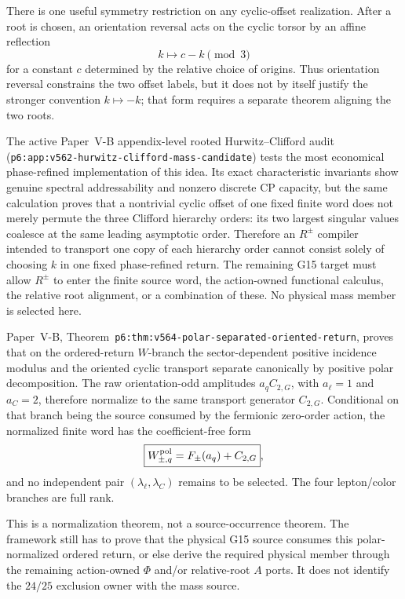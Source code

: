 \documentclass[11pt,a4paper]{article}
\begin{document}
There is one useful symmetry restriction on any cyclic-offset realization.
After a root is chosen, an orientation reversal acts on the cyclic torsor by
an affine reflection
\begin{equation}
\label{p5:eq:v369-affine-cyclic-reflection}
 k\longmapsto c-k\pmod 3
\end{equation}
for a constant \(c\) determined by the relative choice of origins.  Thus
orientation reversal constrains the two offset labels, but it does not by
itself justify the stronger convention \(k\mapsto-k\); that form requires a
separate theorem aligning the two roots.

The active Paper~V-B appendix-level rooted Hurwitz--Clifford audit
(\texttt{p6:app:v562-\allowbreak hurwitz-\allowbreak clifford-\allowbreak mass-\allowbreak candidate}) tests
the most economical phase-refined implementation of this idea.  Its exact
characteristic invariants show genuine spectral addressability and nonzero
discrete CP capacity, but the same calculation proves that a nontrivial
cyclic offset of one fixed finite word does not merely permute the three
Clifford hierarchy orders: its two largest singular values coalesce at the
same leading asymptotic order.  Therefore an \(R^\pm\) compiler intended to
transport one copy of each hierarchy order cannot consist solely of choosing
\(k\) in one fixed phase-refined return.  The remaining G15 target must allow
\(R^\pm\) to enter the finite source word, the action-owned functional
calculus, the relative root alignment, or a combination of these.  No
physical mass member is selected here.

\begin{corollary}
\label{p5:cor:v371-polar-normalized-g15-w-branch}
Paper~V-B, Theorem~\texttt{p6:thm:v564-polar-separated-oriented-return},
proves that on the ordered-return \(W\)-branch the sector-dependent positive
incidence modulus and the oriented cyclic transport separate canonically by
positive polar decomposition.  The raw orientation-odd amplitudes
\(a_qC_{2,G}\), with \(a_\ell=1\) and \(a_C=2\), therefore normalize to the
same transport generator \(C_{2,G}\).  Conditional on that branch being the
source consumed by the fermionic zero-order action, the normalized finite
word has the coefficient-free form
\[
 \boxed{W_{\pm,q}^{\rm pol}=F_\pm(a_q)+C_{2,G}},
\]
and no independent pair \((\lambda_\ell,\lambda_C)\) remains to be selected.
The four lepton/color branches are full rank.

This is a normalization theorem, not a source-occurrence theorem.  The
framework still has to prove that the physical G15 source consumes this
polar-normalized ordered return, or else derive the required physical member
through the remaining action-owned \(\Phi\) and/or relative-root \(A\) ports.
It does not identify the \(24/25\) exclusion owner with the mass source.
\end{corollary}
\end{document}
